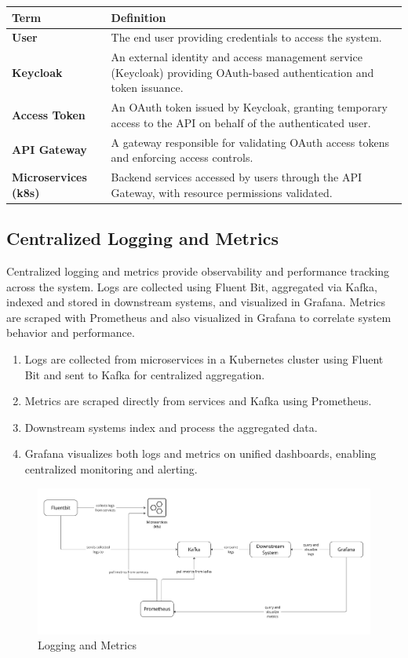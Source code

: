 \begin{longtable}{|l|p{7.5cm}|}
\hline
\textbf{Term} & \textbf{Definition} \\ \hline
\endfirsthead
\textbf{User} & The end user providing credentials to access the system. \\ \hline
\textbf{Keycloak} & An external identity and access management service (Keycloak) providing OAuth-based authentication and token issuance. \\ \hline
\textbf{Access Token} & An OAuth token issued by Keycloak, granting temporary access to the API on behalf of the authenticated user. \\ \hline
\textbf{API Gateway} & A gateway responsible for validating OAuth access tokens and enforcing access controls. \\ \hline
\textbf{Microservices (k8s)} & Backend services accessed by users through the API Gateway, with resource permissions validated. \\ \hline
\end{longtable}
\newpage
\subsection{Centralized Logging and Metrics}

Centralized logging and metrics provide observability and performance tracking across the system. Logs are collected using Fluent Bit, aggregated via Kafka, indexed and stored in downstream systems, and visualized in Grafana. Metrics are scraped with Prometheus and also visualized in Grafana to correlate system behavior and performance.

\begin{enumerate}
    \item Logs are collected from microservices in a Kubernetes cluster using Fluent Bit and sent to Kafka for centralized aggregation.
    \item Metrics are scraped directly from services and Kafka using Prometheus.
    \item Downstream systems index and process the aggregated data.
    \item Grafana visualizes both logs and metrics on unified dashboards, enabling centralized monitoring and alerting.
\end{enumerate}

\begin{figure}[h!]
    \centering
    \includegraphics[width=1\textwidth]{Logging.jpg}
    \caption{Logging and Metrics}
    \label{fig:auth-diagram}
\end{figure}

